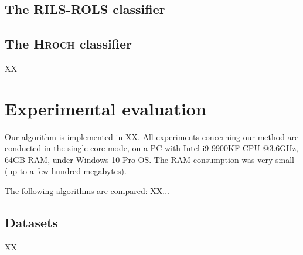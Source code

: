\documentclass{bmcart}
\begin{document}
 
 

\subsection{The \textsc{RILS}-\textsc{ROLS}  classifier}
 
 \subsection{The \textsc{Hroch}  classifier}
 XX
 
\section{Experimental evaluation}\label{sec:experiments}

Our  algorithm is implemented in XX. All experiments concerning our method are conducted in the single-core mode, on a PC with Intel i9-9900KF CPU @3.6GHz, 64GB RAM, under Windows 10 Pro OS. The RAM consumption was very small (up to a few hundred megabytes).   

The following algorithms  are compared: XX...


\subsection{Datasets}
 XX
 
\end{document}
